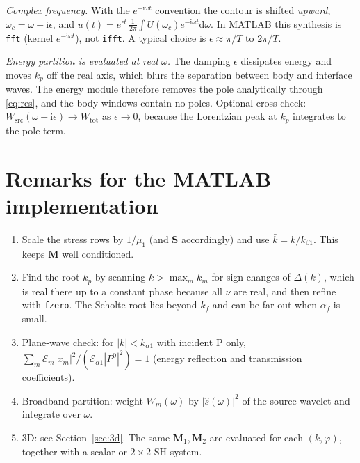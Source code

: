 \documentclass[11pt,a4paper]{article}
\newcommand{\ii}{\mathrm{i}}
\newcommand{\dd}{\mathrm{d}}
\begin{document}
\emph{Complex frequency.} With the $e^{-\ii\omega t}$ convention the contour is shifted \emph{upward},
$\omega_c=\omega+\ii\epsilon$, and
$u(t)=e^{\epsilon t}\,\frac{1}{2\pi}\int U(\omega_c)e^{-\ii\omega t}\dd\omega$. In MATLAB this synthesis is
\texttt{fft} (kernel $e^{-\ii\omega t}$), not \texttt{ifft}. A typical choice is $\epsilon\approx\pi/T$ to
$2\pi/T$.

\emph{Energy partition is evaluated at real $\omega$.} The damping $\epsilon$ dissipates energy and
moves $k_p$ off the real axis, which blurs the separation between body and interface waves. The
energy module therefore removes the pole analytically through \eqref{eq:res}, and the body windows
contain no poles. Optional cross-check: $W_{\mathrm{src}}(\omega+\ii\epsilon)\to W_{\mathrm{tot}}$ as
$\epsilon\to0$, because the Lorentzian peak at $k_p$ integrates to the pole term.

\section{Remarks for the MATLAB implementation}

\begin{enumerate}
  \item Scale the stress rows by $1/\mu_1$ (and $\mathbf S$ accordingly) and use
  $\bar k=k/k_{\beta1}$. This keeps $\mathbf M$ well conditioned.
  \item Find the root $k_p$ by scanning $k>\max_mk_m$ for sign changes of $\Delta(k)$, which is
  real there up to a constant phase because all $\nu$ are real, and then refine with \texttt{fzero}.
  The Scholte root lies beyond $k_f$ and can be far out when $\alpha_f$ is small.
  \item Plane-wave check: for $|k|<k_{\alpha1}$ with incident P only,
  $\sum_m\mathcal E_m|x_m|^2/(\mathcal E_{\alpha1}|P^0|^2)=1$ (energy reflection and transmission
  coefficients).
  \item Broadband partition: weight $W_m(\omega)$ by $|\hat s(\omega)|^2$ of the source wavelet and
  integrate over $\omega$.
  \item 3D: see Section~\ref{sec:3d}. The same $\mathbf M_1,\mathbf M_2$ are evaluated for each
  $(k,\varphi)$, together with a scalar or $2\times2$ SH system.
\end{enumerate}
\end{document}
